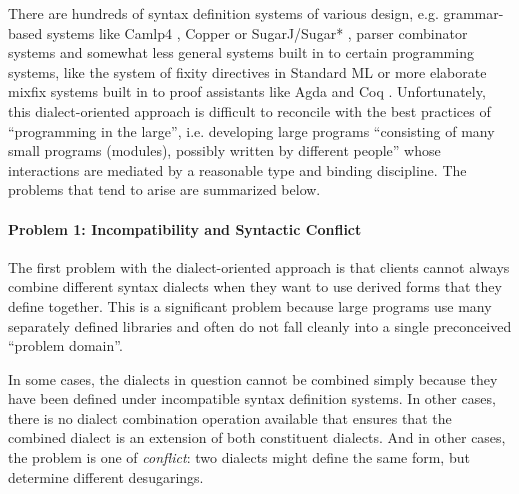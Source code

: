 \documentclass[acmlarge,review,anonymous]{acmart}\settopmatter{printfolios=true}
\begin{document}
There are hundreds of syntax definition systems of various design, e.g. grammar-based systems like Camlp4 \cite{ocaml-manual}, Copper \cite{conf/gpce/WykS07} or SugarJ/Sugar* \cite{erdweg2011sugarj,erdweg2013framework}, parser combinator systems \cite{Hutton1992d} and somewhat less general systems built in to certain programming systems, like the system of fixity directives in Standard ML \cite{mthm97-for-dart} or more elaborate mixfix systems \cite{5134,DBLP:conf/gpce/TahaJ03} built in to proof assistants like Agda \cite{DBLP:conf/ifl/DanielssonN08} and Coq \cite{Coq:manual}. 
Unfortunately, this dialect-oriented approach is difficult to reconcile with the best practices of ``programming in the large'', i.e. developing large programs ``consisting of many small programs (modules), possibly written by different people''   \cite{DeRemer76} whose interactions are mediated by a reasonable type and binding discipline. The problems that tend to arise are summarized below.%

\paragraph{Problem 1: Incompatibility and Syntactic Conflict}
The first problem with the dialect-oriented approach is that clients  cannot always combine different syntax dialects when they want to use derived forms that they define together. This is a significant problem because large programs use many separately defined libraries \cite{DBLP:conf/sac/LammelPS11} and often do not fall cleanly into a single preconceived ``problem domain''. 

In some cases, the dialects in question cannot be combined simply because they have been defined under incompatible syntax definition systems. In other cases, there is no dialect combination operation available that ensures that the combined dialect is an extension of both constituent dialects. And in other cases, the problem is one of \emph{conflict}: two dialects might define the same form, but determine different desugarings.
\end{document}
